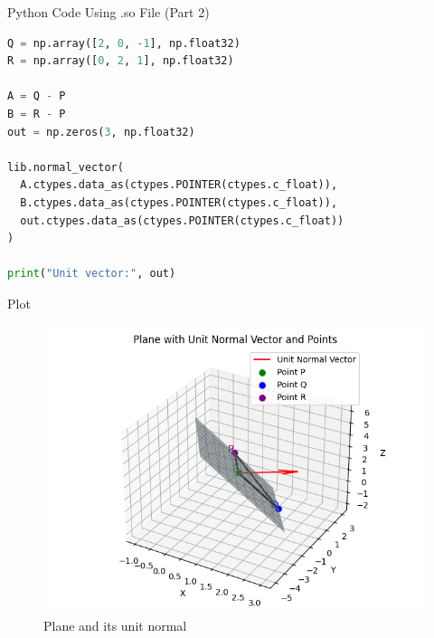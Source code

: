 \documentclass{beamer}
\begin{document}
\begin{frame}[fragile]{Python Code Using .so File (Part 2)}
\begin{lstlisting}[language=Python]
Q = np.array([2, 0, -1], np.float32)
R = np.array([0, 2, 1], np.float32)

A = Q - P
B = R - P
out = np.zeros(3, np.float32)

lib.normal_vector(
  A.ctypes.data_as(ctypes.POINTER(ctypes.c_float)),
  B.ctypes.data_as(ctypes.POINTER(ctypes.c_float)),
  out.ctypes.data_as(ctypes.POINTER(ctypes.c_float))
)

print("Unit vector:", out)
\end{lstlisting}
\end{frame}



















\begin{frame}{Plot}
\begin{figure}[H]
\centering
\includegraphics[width=0.78\linewidth]{Figs/fig1.png}
\caption{Plane and its unit normal}
\end{figure}
\end{frame}
\end{document}
